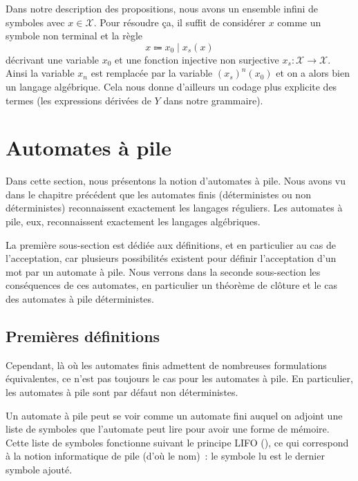 \begin{remark}
  Dans notre description des propositions, nous avons un ensemble infini de
  symboles avec $x \in \mathcal X$. Pour résoudre ça, il suffit de considérer
  $x$ comme un symbole non terminal et la règle
  \[x \Coloneq x_0\mid x_s(x)\]
  décrivant une variable $x_0$ et une fonction injective non surjective
  $x_s : \mathcal X \to \mathcal X$. Ainsi la variable $x_n$ est remplacée par
  la variable $(x_s)^n(x_0)$ et on a alors bien un langage algébrique. Cela
  nous donne d'ailleurs un codage plus explicite des termes (les expressions
  dérivées de $Y$ dans notre grammaire).
\end{remark}

\section{Automates à pile}

Dans cette section, nous présentons la notion d'automates à pile. Nous avons vu
dans le chapitre précédent que les automates finis (déterministes ou non
déterministes) reconnaissent exactement les langages réguliers. Les automates à pile,
eux, reconnaissent exactement les langages algébriques.

La première sous-section est dédiée aux définitions, et en particulier au cas de
l'acceptation, car plusieurs possibilités existent pour définir l'acceptation d'un mot
par un automate à pile. Nous verrons dans la seconde sous-section les conséquences de
ces automates, en particulier un théorème de clôture et le cas des automates à pile
déterministes.

\subsection{Premières définitions}

Cependant, là où les automates finis admettent de nombreuses formulations équivalentes,
ce n'est pas toujours le cas pour les automates à pile. En particulier, les automates
à pile sont par défaut non déterministes.

Un automate à pile peut se voir comme un automate fini auquel on adjoint une liste de
symboles que l'automate peut lire pour avoir une forme de mémoire. Cette liste de
symboles fonctionne suivant le principe LIFO (), ce
qui correspond à la notion informatique de pile (d'où le nom)~: le symbole lu est le
dernier symbole ajouté.

